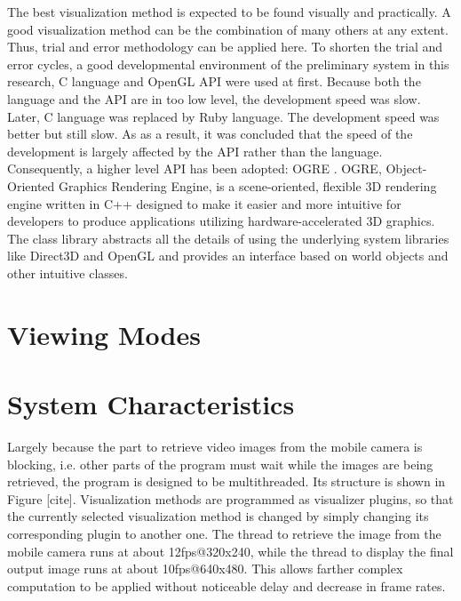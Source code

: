 The best visualization method is expected to be found visually and practically. A good visualization method can be the combination of many others at any extent. Thus, trial and error methodology can be applied here. To shorten the trial and error cycles, a good developmental environment of the preliminary system in this research, C language and OpenGL API \citep{Reference10} were used at first. Because both the language and the API are in too low level, the development speed was slow. Later, C language was replaced by Ruby language. The development speed was better but still slow. As as a result, it was concluded that the speed of the development is largely affected by the API rather than the language. Consequently, a higher level API has been adopted: OGRE \citep{Reference11}. OGRE, Object-Oriented Graphics Rendering Engine, is a scene-oriented, flexible 3D rendering engine written in C++ designed to make it easier and more intuitive for developers to produce applications utilizing hardware-accelerated 3D graphics. The class library abstracts all the details of using the underlying system libraries like Direct3D and OpenGL and provides an interface based on world objects and other intuitive classes.

\section{Viewing Modes}

\section{System Characteristics}

Largely because the part to retrieve video images from the mobile camera is blocking, i.e. other parts of the program must wait while the images are being retrieved, the program is designed to be multithreaded. Its structure is shown in Figure [cite]. Visualization methods are programmed as visualizer plugins, so that the currently selected visualization method is changed by simply changing its corresponding plugin to another one. The thread to retrieve the image from the mobile camera runs at about 12fps@320x240, while the thread to display the final output image runs at about 10fps@640x480. This allows farther complex computation to be applied without noticeable delay and decrease in frame rates.
